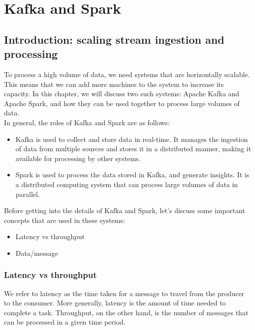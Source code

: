 \chapter{Kafka and Spark}

\section{Introduction: scaling stream ingestion and processing}

To process a high volume of data, we need systems that are horizontally scalable. This means 
that we can add more machines to the system to increase its capacity. In this chapter, we will 
discuss two such systems: Apache Kafka and Apache Spark, and how they can be used together to
process large volumes of data.\\

In general, the roles of Kafka and Spark are as follows:

\begin{itemize}
    \item Kafka is used to collect and store data in real-time. It manages
    the ingestion of data from multiple sources and stores it in a distributed manner,
    making it available for processing by other systems.

    \item Spark is used to process the data stored in Kafka, and generate insights.
    It is a distributed computing system that can process large volumes of data in parallel.
\end{itemize}

Before getting into the details of Kafka and Spark, let's discuss some important concepts
that are used in these systems:

\begin{itemize}
    \item Latency vs throughput
    \item Data/message
\end{itemize}

\subsection{Latency vs throughput}

We refer to latency as the time taken for a message to travel from the producer to the consumer.
More generally, latency is the amount of time needed to complete a task. Throughput, on the other 
hand, is the number of messages that can be processed in a given time period.\\

